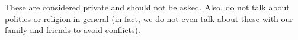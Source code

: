 \documentclass[oneside,11pt,dvipsnames]{book}
\begin{document}
  These are considered private and should not be asked.  Also, do not talk about politics or religion in general (in fact, we do not even talk about these with our family and friends to avoid conflicts).  
  
  
  
  






\end{document}
